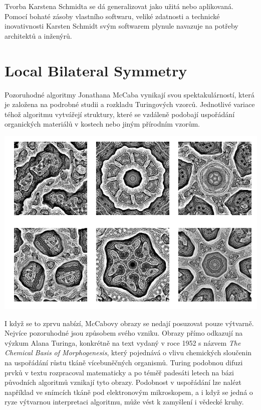 \documentclass[10pt,twoside=true,open=right,cleardoublepage=empty,chapterprefix=true]{scrbook}
\newcommand{\oddil}[1]{\section{#1}\index{#1}\label{#1}}
\begin{document}
Tvorba Karstena Schmidta  se dá generalizovat jako užitá nebo aplikovaná. Pomocí bohaté zásoby vlastního softwaru, veliké zdatnosti a technické inovativnosti Karsten Schmidt svým softwarem plynule navazuje na potřeby architektů a inženýrů.



\oddil{Local Bilateral Symmetry}


Pozoruhodné algoritmy Jonathana McCaba vynikají svou spektakulárností, která je založena na podrobné studii a rozkladu Turingových vzorců. Jednotlivé variace téhož algoritmu vytvářejí struktury, které se vzdáleně podobají uspořádání organických materiálů v kostech nebo jiným přírodním vzorům.


\begin{center}
\includegraphics[width = 1\textwidth]{imgs/mcCabe1.png}
\end{center}

I když se to zprvu nabízí,  McCabovy obrazy se nedají posuzovat pouze výtvarně. Nejvíce pozoruhodné jsou způsobem svého vzniku. Obrazy přímo odkazují na výzkum Alana Turinga, konkrétně na text vydaný v roce 1952 s názvem {\em The Chemical Basis of Morphogenesis}, který pojednává o vlivu chemických sloučenin na uspořádání růstu tkáně vícebuněčných organismů. Turing podobnou difuzi prvků v textu rozpracoval matematicky a po téměř padesáti letech na bázi původních algoritmů vznikají tyto obrazy. Podobnost v uspořádání lze nalézt například ve snímcích tkáně pod elektronovým mikroskopem, a i když se jedná o ryze výtvarnou interpretaci algoritmu, může vést k zamyšlení i vědecké kruhy.
\end{document}
